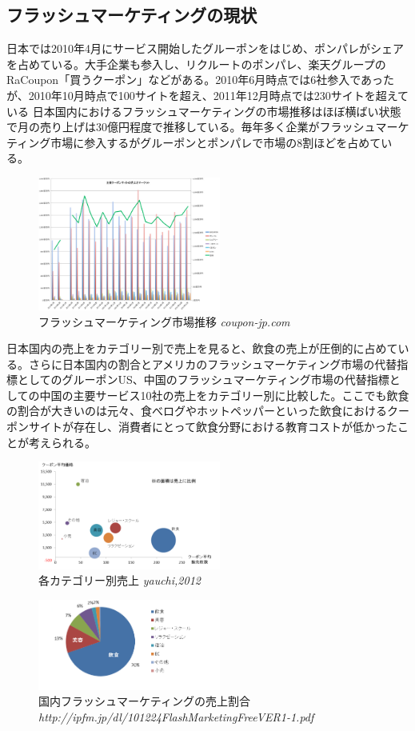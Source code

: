 \subsection{フラッシュマーケティングの現状}
日本では2010年4月にサービス開始したグルーポンをはじめ、ポンパレがシェアを占めている。大手企業も参入し、リクルートのポンパレ、楽天グループのRaCoupon「買うクーポン」などがある。2010年6月時点では6社参入であったが、2010年10月時点で100サイトを超え、2011年12月時点では230サイトを超えている
日本国内におけるフラッシュマーケティングの市場推移はほぼ横ばい状態で月の売り上げは30億円程度で推移している。毎年多く企業がフラッシュマーケティング市場に参入するがグルーポンとポンパレで市場の8割ほどを占めている。
\\
\begin{figure}[htbp]
	\centering
	\includegraphics[width=6cm, bb=0 0 330 272]{figures/shijo.jpg}
	\caption{フラッシュマーケティング市場推移 {\itshape coupon-jp.com}}
	\label{フラッシュマーケティング市場推移}
\end{figure}
\newpage
日本国内の売上をカテゴリー別で売上を見ると、飲食の売上が圧倒的に占めている。さらに日本国内の割合とアメリカのフラッシュマーケティング市場の代替指標としてのグルーポンUS、中国のフラッシュマーケティング市場の代替指標としての中国の主要サービス10社の売上をカテゴリー別に比較した。ここでも飲食の割合が大きいのは元々、食べログやホットペッパーといった飲食におけるクーポンサイトが存在し、消費者にとって飲食分野における教育コストが低かったことが考えられる。
\begin{figure}[htbp]
	\centering
	\includegraphics[width=6cm, bb=0 0 330 272]{figures/cate.jpg}
	\caption{各カテゴリー別売上 {\itshape yauchi,2012}}
	\label{各カテゴリー別売上}
\end{figure}
\begin{figure}[htbp]
	\centering
	\includegraphics[width=6cm, bb=0 0 330 272]{figures/gjp.jpg}
	\caption{国内フラッシュマーケティングの売上割合 {\itshape http://ipfm.jp/dl/101224FlashMarketingFreeVER1-1.pdf}}
	\label{国内フラッシュマーケティングの売上割合}
	\end{figure}
	
